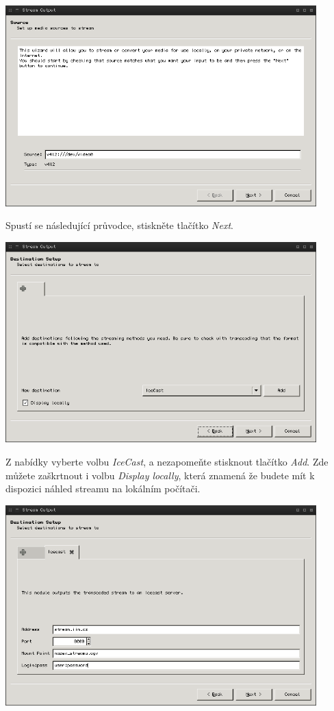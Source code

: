 \documentclass[11pt]{article} %
\begin{document}
\begin{center}
\includegraphics[width=0.9\textwidth]{4}
\end{center}

Spustí se následující průvodce, stiskněte tlačítko {\em Next}.


\begin{center}
\includegraphics[width=0.9\textwidth]{5}
\end{center}

Z nabídky vyberte volbu {\em IceCast}, a nezapomeňte stisknout tlačítko {\em Add}. Zde můžete zaškrtnout i volbu {\em Display locally}, která znamená že budete mít k dispozici náhled streamu na lokálním počítači.



\begin{center}
\includegraphics[width=0.9\textwidth]{6}
\end{center}
\end{document}

